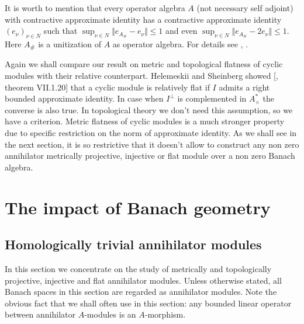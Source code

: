 It is worth to mention that every operator algebra $A$ (not necessary self adjoint) with contractive approximate identity has a contractive approximate identity $(e_\nu)_{\nu\in N}$ such that $\sup_{\nu\in N}\Vert e_{A_\#}-e_\nu\Vert\leq 1$ and even $\sup_{\nu\in N}\Vert e_{A_\#}-2e_\nu\Vert\leq 1$. Here $A_\#$ is a unitization of $A$ as operator algebra. For details see \cite{PosAndApproxIdinBanAlg}, \cite{BleContrAppIdInOpAlg}.

Again we shall compare our result on metric and topological flatness of cyclic modules with their relative counterpart. Helemeskii and Sheinberg showed [\cite{HelHomolBanTopAlg}, theorem VII.1.20] that a cyclic module is relatively flat if $I$ admits a right bounded approximate identity. In case when $I^\perp$ is complemented in $A_\times^*$ the converse is also true. In topological theory we don't need this assumption, so we have a criterion. Metric flatness of cyclic modules is a much stronger property due to specific restriction on the norm of approximate identity. As we shall see in the next section, it is so restrictive that it doesn't allow to construct any non zero annihilator metrically projective, injective or flat module over a non zero Banach algebra.


\section{The impact of Banach geometry}
\label{SectionTheImpactOfBanachGeometry}



\subsection{Homologically trivial annihilator modules}
\label{SubSectionHomoligicallyTrivialAnnihilatorModules}

In this section we concentrate on the study of metrically and topologically projective, injective and flat annihilator modules. Unless otherwise stated, all Banach spaces in this section are regarded as annihilator modules. Note the obvious fact that we shall often use in this section: any bounded linear operator between annihilator $A$-modules is an $A$-morphism.

